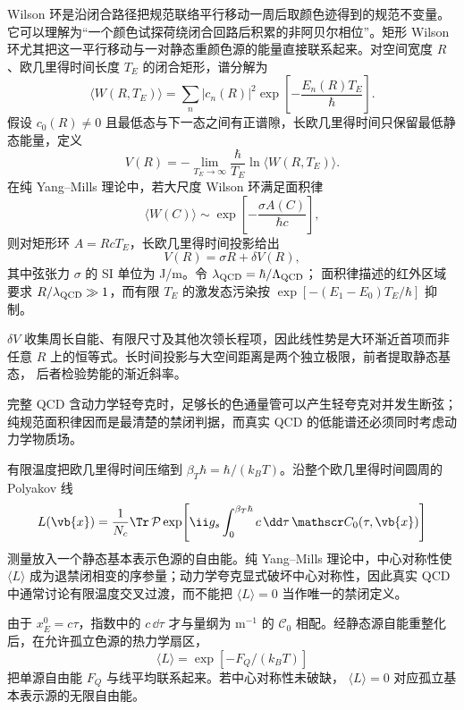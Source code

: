 \begin{proposition}
Wilson 环是沿闭合路径把规范联络平行移动一周后取颜色迹得到的规范不变量。它可以理解为“一个颜色试探荷绕闭合回路后积累的非阿贝尔相位”。矩形 Wilson 环尤其把这一平行移动与一对静态重颜色源的能量直接联系起来。对空间宽度 $R$、欧几里得时间长度 $T_E$ 的闭合矩形，谱分解为
\begin{equation}
 \langle W(R,T_E)\rangle
 =\sum_n|c_n(R)|^2
 \exp\!\left[-\frac{E_n(R)T_E}{\hbar}\right].
 \label{eq:wilson-loop-spectral-dp11}
\end{equation}
假设 $c_0(R)\ne0$ 且最低态与下一态之间有正谱隙，长欧几里得时间只保留最低静态能量，定义
\begin{equation}
 {
 V(R)
 =-\lim_{T_E\to\infty}
 \frac\hbar{T_E}\ln\langle W(R,T_E)\rangle.}
 \label{eq:static-potential-from-wilson-dp11}
\end{equation}
在纯 Yang--Mills 理论中，若大尺度 Wilson 环满足面积律
\begin{equation}
 \langle W(C)\rangle
 \sim\exp\!\left[-\frac{\sigma A(C)}{\hbar c}\right],
 \label{eq:wilson-area-law-dp11}
\end{equation}
则对矩形环 $A=RcT_E$，长欧几里得时间投影给出
\begin{equation}
 {V(R)=\sigma R+\delta V(R),}
 \label{eq:linear-potential-area-law-dp11}
\end{equation}
其中弦张力 $\sigma$ 的 SI 单位为 J/m。令 $\lambda_{\rm QCD}=\hbar/\Lambda_{\rm QCD}$；
面积律描述的红外区域要求 $R/\lambda_{\rm QCD}\gg1$，而有限 $T_E$ 的激发态污染按
$\exp[-(E_1-E_0)T_E/\hbar]$ 抑制。

$\delta V$ 收集周长自能、有限尺寸及其他次领长程项，因此线性势是大环渐近首项而非
任意 $R$ 上的恒等式。长时间投影与大空间距离是两个独立极限，前者提取静态基态，
后者检验势能的渐近斜率。

完整 QCD 含动力学轻夸克时，足够长的色通量管可以产生轻夸克对并发生断弦；
纯规范面积律因而是最清楚的禁闭判据，而真实 QCD 的低能谱还必须同时考虑动力学物质场。
\end{proposition}

\begin{definition}
有限温度把欧几里得时间压缩到 $\beta_T\hbar=\hbar/(k_BT)$。沿整个欧几里得时间圆周的 Polyakov 线
\begin{equation*}
 L(\vb{x})
 =\frac1{N_c}\Tr\,\mathcal P
 \exp\!\left[
 \ii g_s\int_0^{\beta_T\hbar}c\,\dd\tau\,
 \mathscr C_0(\tau,\vb{x})
 \right]
\end{equation*}
测量放入一个静态基本表示色源的自由能。纯 Yang--Mills 理论中，中心对称性使 $\langle L\rangle$ 成为退禁闭相变的序参量；动力学夸克显式破坏中心对称性，因此真实 QCD 中通常讨论有限温度交叉过渡，而不能把 $\langle L\rangle=0$ 当作唯一的禁闭定义。

由于 $x_E^0=c\tau$，指数中的 $c\,\dd\tau$ 才与量纲为 $\mathrm{m^{-1}}$ 的
$\mathscr C_0$ 相配。经静态源自能重整化后，在允许孤立色源的热力学扇区，
\begin{equation*}
\langle L\rangle=\exp[-F_Q/(k_BT)]
\end{equation*}
把单源自由能 $F_Q$ 与线平均联系起来。若中心对称性未破缺，
$\langle L\rangle=0$ 对应孤立基本表示源的无限自由能。
\end{definition}

